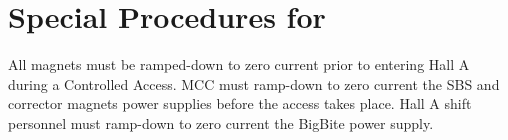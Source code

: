 
%
%
\newpage
\section{Special Procedures for \HALL}
 All magnets must be ramped-down to zero current prior to entering Hall A during a Controlled Access.
MCC must ramp-down to zero current the SBS and corrector magnets power supplies before the access
takes place. Hall A shift personnel must ramp-down to zero current the BigBite power supply.

%
%




 


